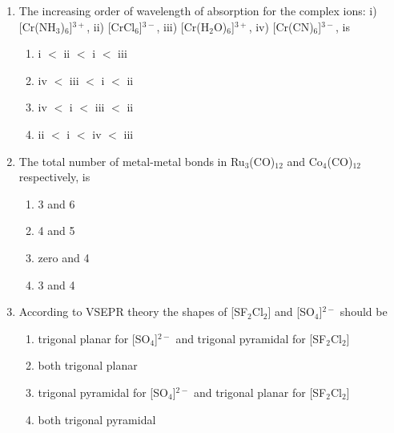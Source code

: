 \documentclass[journal,12pt,onecolumn]{IEEEtran}
\theoremstyle{remark}
\begin{document}
\begin{enumerate}
\item    \hspace{0.5cm} The increasing order of wavelength of absorption for the complex ions:  
i) [Cr(NH$_3$)$_6$]$^{3+}$, ii) [CrCl$_6$]$^{3-}$, iii) [Cr(H$_2$O)$_6$]$^{3+}$, iv) [Cr(CN)$_6$]$^{3-}$, is  \hfill{}

\begin{multicols}{2}
\begin{enumerate}
    \item i $<$ ii $<$ i $<$ iii
    \item iv $<$ iii $<$ i $<$ ii
    \item iv $<$ i $<$ iii $<$ ii
    \item ii $<$ i $<$ iv $<$ iii
\end{enumerate}
\end{multicols}
 

\item    \hspace{0.5cm} The total number of metal-metal bonds in Ru$_3$(CO)$_{12}$ and Co$_4$(CO)$_{12}$ respectively, is  \hfill{}

\begin{multicols}{2}
\begin{enumerate}
    \item 3 and 6
    \item 4 and 5
    \item zero and 4
    \item 3 and 4
\end{enumerate}
\end{multicols}

\item    \hspace{0.5cm} According to VSEPR theory the shapes of [SF$_2$Cl$_2$] and [SO$_4$]$^{2-}$ should be  \hfill{}

\begin{multicols}{2}
\begin{enumerate}
    \item trigonal planar for [SO$_4$]$^{2-}$ and trigonal pyramidal for [SF$_2$Cl$_2$]
    \item both trigonal planar
    \item trigonal pyramidal for [SO$_4$]$^{2-}$ and trigonal planar for [SF$_2$Cl$_2$]
    \item both trigonal pyramidal
\end{enumerate}
\end{multicols}


\end{enumerate}
\end{document}
